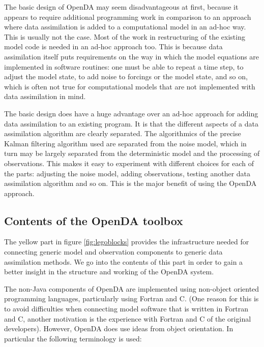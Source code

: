 The basic design of OpenDA may seem disadvantageous at first, because it appears to require additional programming work in comparison to an approach where data assimilation is added to a computational model in an ad-hoc way. This is usually not the case. Most of the work in restructuring of the existing model code is needed in an ad-hoc approach too. This is because data assimilation itself puts requirements on the way in which the model equations are implemented in software routines: one must be able to repeat a time step, to adjust the model state, to add noise to forcings or the model state, and so on, which is often not true for computational models that are not implemented with data assimilation in mind.

The basic design does have a huge advantage over an ad-hoc approach for adding data assimilation to an existing program. It is that the different aspects of a data assimilation algorithm are clearly separated. The algorithmics of the precise Kalman filtering algorithm used are separated from the noise model, which in turn may be largely separated from the deterministic model and the processing of observations. This makes it easy to experiment with different choices for each of the parts: adjusting the noise model, adding observations, testing another data assimilation algorithm and so on. This is the major benefit of using the OpenDA approach.

\subsection{Contents of the OpenDA toolbox}

The yellow part in figure \ref{fig:legoblocks} provides the infrastructure needed for connecting generic model and observation components to generic data assimilation methods. We go into the contents of this part in order to gain a better insight in the structure and working of the OpenDA system.

The non-Java components of OpenDA are implemented using non-object oriented programming languages, particularly using Fortran and C. (One reason for this is to avoid difficulties when connecting model software that is written in Fortran and C, another motivation is the experience with Fortran and C of the original developers). However, OpenDA does use ideas from object orientation. In particular the following terminology is used:

